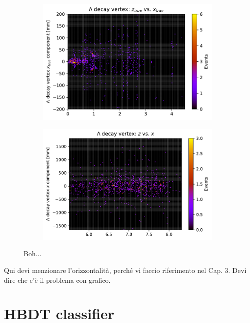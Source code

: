 \begin{figure}[t]
	\centering
	\begin{subfigure}{.45\textwidth}
		\includegraphics[width=\textwidth]{graphics/04-event_selection/LEVz_MC_ztrue-vs-xtrue.pdf}
		\caption{}
	\end{subfigure}
	\begin{subfigure}{.45\textwidth}
		\includegraphics[width=\textwidth]{graphics/04-event_selection/LEVz_MC_z-vs-x.pdf}
		\caption{}
	\end{subfigure}
	\caption[A and b.]{Boh...}
\end{figure}


Qui devi menzionare l'orizzontalità, perché vi faccio riferimento nel Cap. 3. Devi dire che c'è il problema con grafico.

\section{HBDT classifier}
\label{sec:HBDT}

